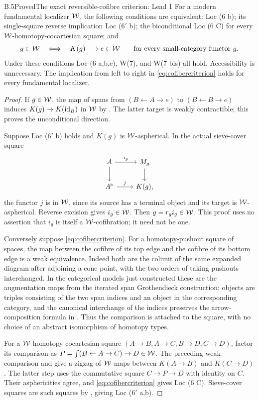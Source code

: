 \begin{claim}{B.5}{Proved}{The exact reversible-cofibre criterion: Lead 1}
For a modern fundamental localizer $\mathcal{W}$, the following conditions are equivalent: Loc (6 b); its single-square reverse implication Loc ($6'$ b); the biconditional Loc (6 C) for every $\mathcal{W}$-homotopy-cocartesian square; and
\begin{equation}\label{eq:cofibercriterion}
 g\in\mathcal{W}\quad\Longleftrightarrow\quad K(g)\longrightarrow e\in\mathcal{W}
 \qquad\text{for every small-category functor }g.
\end{equation}
Under these conditions Loc (6 a,b,c), W(7), and W(7 bis) all hold. Accessibility is unnecessary. The implication from left to right in \eqref{eq:cofibercriterion} holds for every fundamental localizer.
\end{claim}
\begin{proof}
If $g\in\mathcal{W}$, the map of spans from $(B\leftarrow A\to e)$ to $(B\leftarrow B\to e)$ induces $K(g)\to K(\mathrm{id}_B)$ in $\mathcal{W}$ by . The latter target is weakly contractible; this proves the unconditional direction.

Suppose Loc ($6'$ b) holds and $K(g)$ is $\mathcal{W}$-aspherical. In the actual sieve-cover square
\[
 \begin{tikzcd}
 A\arrow[r,"i_g"]\arrow[d]&M_g\arrow[d]\\
 A^{\triangleright}\arrow[r,"j"]&K(g),
 \end{tikzcd}
\]
the functor $j$ is in $\mathcal{W}$, since its source has a terminal object and its target is $\mathcal{W}$-aspherical. Reverse excision gives $i_g\in\mathcal{W}$. Then $g=r_gi_g\in\mathcal{W}$. This proof uses no assertion that $i_g$ is itself a $\mathcal{W}$-cofibration; it need not be one.

Conversely suppose \eqref{eq:cofibercriterion}. For a homotopy-pushout square of spaces, the map between the cofibre of its top edge and the cofibre of its bottom edge is a weak equivalence. Indeed both are the colimit of the same expanded diagram after adjoining a cone point, with the two orders of taking pushouts interchanged. In the categorical models just constructed these are the augmentation maps from the iterated span Grothendieck construction: objects are triples consisting of the two span indices and an object in the corresponding category, and the canonical interchange of the indices preserves the arrow-composition formula in . Thus the comparison is attached to the square, with no choice of an abstract isomorphism of homotopy types.

For a $\mathcal{W}$-homotopy-cocartesian square $(A\to B,A\to C,B\to D,C\to D)$, factor its comparison as $P=\int(B\leftarrow A\to C)\to D\in\mathcal{W}$. The preceding weak comparison and  give a zigzag of $\mathcal{W}$-maps between $K(A\to B)$ and $K(C\to D)$. The latter step uses the commutative square $C\to P\to D$ with identity on $C$. Their asphericities agree, and \eqref{eq:cofibercriterion} gives Loc (6 C). Sieve-cover squares are such squares by , giving Loc ($6'$ a,b).


\end{proof}
